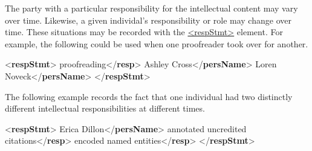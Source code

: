 The party with a particular responsibility for the intellectual content may vary over time. Likewise, a given individal's responsibility or role may change over time. These situations may be recorded with the \hyperref[TEI.respStmt]{<respStmt>} element. For example, the following could be used when one proofreader took over for another. \par\bgroup{}\exampleFont \begin{shaded}\noindent\mbox{}{<\textbf{respStmt}>}\mbox{}\newline 
{}proofreading{</\textbf{resp}>}\mbox{}\newline 
{}Ashley Cross{</\textbf{persName}>}\mbox{}\newline 
{}Loren Noveck{</\textbf{persName}>}\mbox{}\newline 
{</\textbf{respStmt}>}\end{shaded}\egroup\par \noindent  The following example records the fact that one individual had two distinctly different intellectual responsibilities at different times. \par\bgroup{}\exampleFont \begin{shaded}\noindent\mbox{}{<\textbf{respStmt}>}\mbox{}\newline 
{}Erica Dillon{</\textbf{persName}>}\mbox{}\newline 
{}annotated uncredited citations{</\textbf{resp}>}\mbox{}\newline 
{}encoded named entities{</\textbf{resp}>}\mbox{}\newline 
{</\textbf{respStmt}>}\end{shaded}\egroup\par \par
